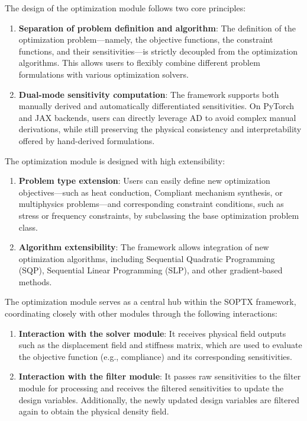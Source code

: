 \documentclass[mathpazo]{cicp}
\begin{document}
The design of the optimization module follows two core principles:
\begin{enumerate}
	\item \textbf{Separation of problem definition and algorithm}: The definition of the optimization problem---namely, the objective functions, the constraint functions, and their sensitivities---is strictly decoupled from the optimization algorithms. This allows users to flexibly combine different problem formulations with various optimization solvers.
	\item \textbf{Dual-mode sensitivity computation}: The framework supports both manually derived and automatically differentiated sensitivities. On PyTorch and JAX backends, users can directly leverage AD to avoid complex manual derivations, while still preserving the physical consistency and interpretability offered by hand-derived formulations.
\end{enumerate}

The optimization module is designed with high extensibility:
\begin{enumerate}
	\item \textbf{Problem type extension}: Users can easily define new optimization objectives---such as heat conduction, Compliant mechanism synthesis, or multiphysics problems---and corresponding constraint conditions, such as stress or frequency constraints, by subclassing the base optimization problem class.
	\item \textbf{Algorithm extensibility}: The framework allows integration of new optimization algorithms, including Sequential Quadratic Programming (SQP), Sequential Linear Programming (SLP), and other gradient-based methods.
\end{enumerate}

The optimization module serves as a central hub within the SOPTX framework, coordinating closely with other modules through the following interactions:
\begin{enumerate}
	\item \textbf{Interaction with the solver module}: It receives physical field outputs such as the displacement field and stiffness matrix, which are used to evaluate the objective function (e.g., compliance) and its corresponding sensitivities.
	\item \textbf{Interaction with the filter module}: It passes raw sensitivities to the filter module for processing and receives the filtered sensitivities to update the design variables. Additionally, the newly updated design variables are filtered again to obtain the physical density field.
\end{enumerate}
\end{document}
